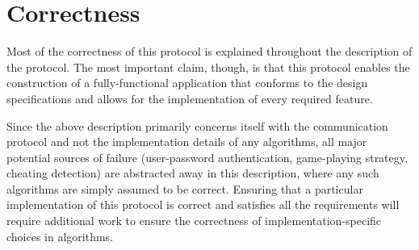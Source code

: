 \documentclass[12pt,letterpaper]{article}
\begin{document}
\section*{Correctness}

Most of the correctness of this protocol is explained throughout the description of the protocol.  The most important claim, though, is that this protocol enables the construction of a fully-functional application that conforms to the design specifications and allows for the implementation of every required feature.

Since the above description primarily concerns itself with the communication protocol and not the implementation details of any algorithms, all major potential sources of failure (user-password authentication, game-playing strategy, cheating detection) are abstracted away in this description, where any such algorithms are simply assumed to be correct.  Ensuring that a particular implementation of this protocol is correct and satisfies all the requirements will require additional work to ensure the correctness of implementation-specific choices in algorithms.
\end{document}
